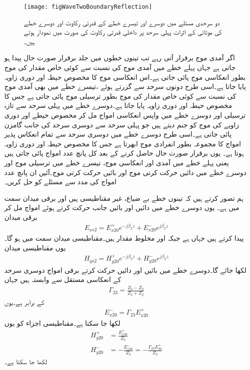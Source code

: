\begin{figure}
\centering
\texttt{[image: figWaveTwoBoundaryReflection]}
\caption{دو سرحدی  مسئلے میں دوسرے اور تیسرے خطے کے قدرتی رکاوٹ اور دوسرے خطے کی موٹائی کے اثرات پہلی سرحد پر داخلی قدرتی رکاوٹ کی صورت میں نمودار ہوتے ہیں۔}
\label{شکل_مستوی_دو_سرحد_مسئلہ}
\end{figure}

اگر آمدی موج برقرار آتی رہے  تب تینوں خطوں میں جلد برقرار صورت حال پیدا ہو جاتی ہے جہاں پہلے خطے میں آمدی موج کی نسبت سے کوئی خاص مقدار کی موج بطور انعکاسی موج پائی جاتی ہے۔اس انعکاسی موج کا مخصوص حیطہ اور دوری زاویہ پایا جاتا ہے۔اسی طرح دونوں سرحد سے گزرتے ہوئے ،تیسرے خطے میں بھی آمدی موج کی نسبت سے کوئی خاص مقدار کی موج بطور ترسیلی موج پائی جاتی ہے جس کا مخصوص حیطہ اور دوری زاویہ پایا جاتا ہے۔دوسرے خطے میں پہلی سرحد سے تازہ ترسیلی اور دوسرے خطے میں واپس انعکاسی امواج مل کر مخصوص حیطے اور دوری زاویے کی موج کو جنم دیتے ہیں جو پہلی سرحد سے دوسری سرحد کی جانب گامزن پائی جاتی ہے۔اسی طرح دوسرے خطے میں دوسری سرحد سے تمام انعکاس پذیر امواج کا مجموعہ بطور انفرادی موج ابھرتا ہے جس کا مخصوص حیطہ اور دوری زاویہ ہوتا ہے۔ یوں برقرار صورت حال حاصل کرنے کے بعد کل پانچ عدد امواج پائی جاتی ہیں یعنی پہلے خطے میں آمدی اور انعکاسی موج، تیسرے خطے میں ترسیلی موج اور دوسرے خطے میں دائیں حرکت کرتی موج اور بائیں حرکت کرتی موج۔آئیں ان پانچ عدد امواج کی مدد سے مسئلے کو حل کریں۔

ہم تصور کرتے ہیں کہ تینوں خطے بے ضیاع، غیر مقناطیسی ہیں اور برقی میدان  سمت میں ہے۔ یوں دوسرے خطے میں دائیں اور بائیں جانب حرکت کرتے ہوئے امواج مل کر برقی میدان 
\begin{align}
E_{xs2}=E_{x20}^+ e^{-j\beta_2 z}+E_{x20}^- e^{j \beta_2 z}
\end{align}
پیدا کرتے ہیں جہاں  ہے جبکہ  اور  مخلوط مقدار ہیں۔مقناطیسی میدان  سمت میں ہو گا۔یوں مقناطیسی میدان
\begin{align}
H_{ys2}=H_{y20}^+ e^{-j\beta_2 z}+H_{y20}^- e^{j \beta_2 z}
\end{align}
لکھا جائے گا۔دوسرے خطے میں بائیں اور دائیں حرکت کرتے برقی امواج دوسری سرحد کے انعکاسی مستقل  سے وابستہ ہیں جہاں
\begin{align}\label{مساوات_مستوی_دو_سرحد_انعکاسی_مستقل_دو}
\Gamma_{23}=\frac{Z_3-Z_2}{Z_3+Z_2}
\end{align}
کے برابر ہے۔یوں
\begin{align}\label{مساوات_مستوی_دو_سرحد_برقی_دو}
E_{x20}^-=\Gamma_{23} E_{x20}^+
\end{align}
لکھا جا سکتا ہے۔مقناطیسی اجزاء کو یوں 
\begin{align}\label{مساوات_مستوی_دو_سرحد_مقناطیسی_دو}
H_{y20}^+&=\frac{E_{x20}^+}{Z_2}\\
H_{y20}^-&=-\frac{E_{x20}^-}{Z_2}=-\frac{\Gamma_{23} E_{20}^+}{Z_2}
\end{align}
لکھا جا سکتا ہے۔

